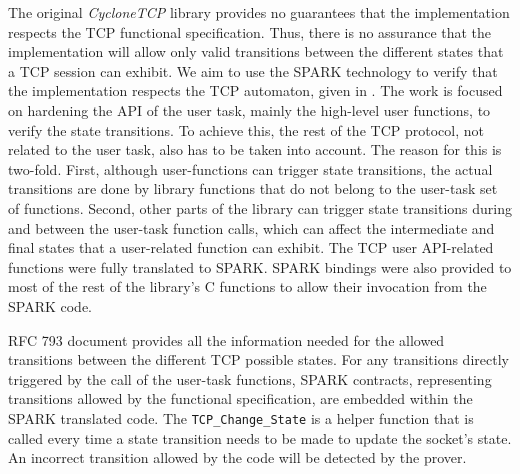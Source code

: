 \documentclass[conference]{IEEEtran}
\begin{document}
The original \emph{CycloneTCP} library provides no guarantees that the implementation respects the TCP functional specification. Thus, there is no assurance that the implementation will allow only valid transitions between the different states that a TCP session can exhibit. We aim to use the SPARK technology to verify that the implementation respects the TCP automaton, given in . The work is focused on hardening the API of the user task, mainly the high-level user functions, to verify the state transitions. To achieve this, the rest of the TCP protocol, not related to the user task, also has to be taken into account. The reason for this is two-fold. First, although user-functions can trigger state transitions, the actual transitions are done by library functions that do not belong to the user-task set of functions. Second, other parts of the library can trigger state transitions during and between the user-task function calls, which can affect the intermediate and final states that a user-related function can exhibit. The TCP user API-related functions were fully translated to SPARK. SPARK bindings were also provided to most of the rest of the library's C functions to allow their invocation from the SPARK code.

RFC 793 document provides all the information needed for the allowed transitions between the different TCP possible states. For any transitions directly triggered by the call of the user-task functions, SPARK contracts, representing transitions allowed by the functional specification, are embedded within the SPARK translated code. The \texttt{TCP\_Change\_State} is a helper function that is called every time a state transition needs to be made to update the socket's state. An incorrect transition allowed by the code will be detected by the prover.



%
\end{document}
